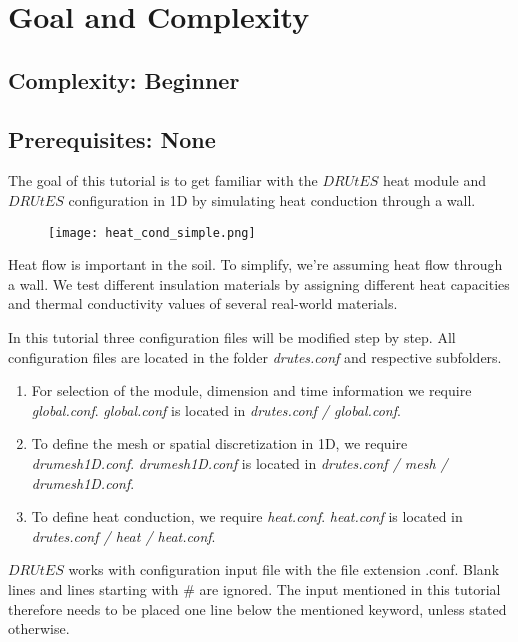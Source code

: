\documentclass[
10pt, %
a4paper, %
oneside, %
headinclude,footinclude, %
BCOR5mm, %
]{scrartcl}
\begin{document}
\section{Goal and Complexity}
\subsection*{Complexity: Beginner}

\subsection*{Prerequisites: None}

The goal of this tutorial is to get familiar with the $DRUtES$ heat module and  $DRUtES$ configuration in 1D by simulating heat conduction through a wall.\medskip

\begin{figure}[!h]
\centering
\texttt{[image: heat\_cond\_simple.png]}
\end{figure}
Heat flow is important in the soil. To simplify, we're assuming heat flow through a wall. We test different insulation materials by assigning different heat capacities and thermal conductivity values of several real-world materials. 

In this tutorial three configuration files will be modified step by step. All configuration files are located in the folder \emph{drutes.conf} and respective subfolders. \begin{enumerate}
\item For selection of the module, dimension and time information we require \emph{global.conf}.  \emph{global.conf} is located in \emph{drutes.conf / global.conf}. 
\item To define the mesh or spatial discretization in 1D,  we require \emph{drumesh1D.conf}. \emph{drumesh1D.conf} is located in \emph{drutes.conf / mesh / drumesh1D.conf}. 
\item To define heat conduction, we require \emph{heat.conf}. \emph{heat.conf} is located in \emph{drutes.conf / heat / heat.conf}. 
\end{enumerate}
$DRUtES$ works with configuration input file with the file extension .conf. Blank lines and lines starting with \# are ignored. The input mentioned in this tutorial therefore needs to be placed one line below the mentioned keyword, unless stated otherwise. 
\end{document}
